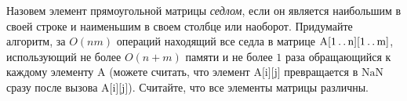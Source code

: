 \documentclass{article}
\begin{document}
Назовем элемент прямоугольной матрицы \textit{седлом}, если он является наибольшим в своей строке и наименьшим в своем столбце или наоборот. Придумайте алгоритм, за $O(nm)$ операций находящий все седла в матрице $\text{A[1\,.\,.\,n][1\,.\,.\,m]}$, использующий не более $O(n+m)$ памяти и не более $1$ раза обращающийся к каждому элементу $\text{A}$ (можете считать, что элемент $\text{A[i][j]}$ превращается в $\text{NaN}$ сразу после вызова $\text{A[i][j]}$). Считайте, что все элементы матрицы различны.
\end{document}
